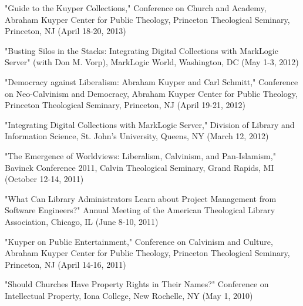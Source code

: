 \documentclass[10pt]{res} %
\begin{document}
\begin{resume}
\begin{hangparas}{.25in}{1}"Guide to the Kuyper Collections," Conference on Church and Academy, Abraham Kuyper Center for Public Theology, Princeton Theological Seminary, Princeton, NJ (April 18-20, 2013)\end{hangparas}

\begin{hangparas}{.25in}{1}"Busting Silos in the Stacks: Integrating Digital Collections with MarkLogic Server" (with Don M. Vorp), MarkLogic World, Washington, DC (May 1-3, 2012)\end{hangparas}

\begin{hangparas}{.25in}{1}"Democracy against Liberalism: Abraham Kuyper and Carl Schmitt," Conference on Neo-Calvinism and Democracy, Abraham Kuyper Center for Public Theology, Princeton Theological Seminary, Princeton, NJ (April 19-21, 2012)\end{hangparas}

\begin{hangparas}{.25in}{1}"Integrating Digital Collections with MarkLogic Server," Division of Library and Information Science, St. John’s University, Queens, NY (March 12, 2012)\end{hangparas}

\begin{hangparas}{.25in}{1}"The Emergence of Worldviews: Liberalism, Calvinism, and Pan-Islamism," Bavinck Conference 2011, Calvin Theological Seminary, Grand Rapids, MI (October 12-14, 2011)\end{hangparas}

\begin{hangparas}{.25in}{1}"What Can Library Administrators Learn about Project Management from Software Engineers?" Annual Meeting of the American Theological Library Association, Chicago, IL (June 8-10, 2011)\end{hangparas}

\begin{hangparas}{.25in}{1}"Kuyper on Public Entertainment," Conference on Calvinism and Culture, Abraham Kuyper Center for Public Theology, Princeton Theological Seminary, Princeton, NJ (April 14-16, 2011)\end{hangparas}

\begin{hangparas}{.25in}{1}"Should Churches Have Property Rights in Their Names?" Conference on Intellectual Property, Iona College, New Rochelle, NY (May 1, 2010)\end{hangparas}


\end{resume}
\end{document}
